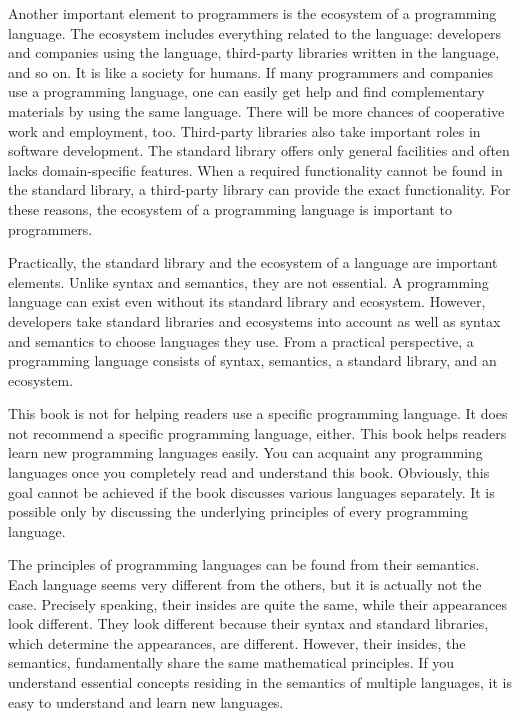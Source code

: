 Another important element to programmers is the ecosystem of a programming
language. The ecosystem includes everything related to the language: developers
and companies using the language, third-party libraries written in the language,
and so on. It is like a society for humans. If many programmers and companies
use a programming language, one can easily get help and find complementary
materials by using the same language. There will be more chances of cooperative
work and employment, too. Third-party libraries also take important roles in
software development. The standard library offers only general facilities and
often lacks domain-specific features. When a required functionality cannot be
found in the standard library, a third-party library can provide the exact
functionality. For these reasons, the ecosystem of a programming language is
important to programmers.

Practically, the standard library and the ecosystem of a language are important
elements. Unlike syntax and semantics, they are not essential. A programming
language can exist even without its standard library and ecosystem. However,
developers take standard libraries and ecosystems into account as well as syntax and
semantics to choose languages they use. From a practical perspective, a
programming language consists of syntax, semantics, a standard library, and an
ecosystem.

This book is not for helping readers use a specific programming language. It
does not recommend a specific programming language, either. This book helps
readers learn new programming languages easily. You can acquaint any programming
languages once you completely read and understand this book. Obviously, this
goal cannot be achieved if the book discusses various languages separately. It
is possible only by discussing the underlying principles of every programming
language.

The principles of programming languages can be found from their semantics. Each
language seems very different from the others, but it is actually not the case.
Precisely speaking, their insides are quite the same, while their appearances
look different. They look different because their syntax and standard libraries,
which determine the appearances, are different. However, their insides, the
semantics, fundamentally share the same mathematical principles. If you
understand essential concepts residing in the semantics of multiple languages,
it is easy to understand and learn new languages.

